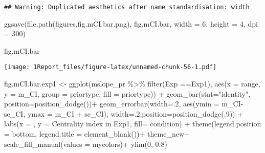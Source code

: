 \documentclass[
]{article}
\newenvironment{Shaded}{\begin{snugshade}}{\end{snugshade}}
\newcommand{\AttributeTok}[1]{\textcolor[rgb]{0.77,0.63,0.00}{#1}}
\newcommand{\DecValTok}[1]{\textcolor[rgb]{0.00,0.00,0.81}{#1}}
\newcommand{\FloatTok}[1]{\textcolor[rgb]{0.00,0.00,0.81}{#1}}
\newcommand{\FunctionTok}[1]{\textcolor[rgb]{0.00,0.00,0.00}{#1}}
\newcommand{\NormalTok}[1]{#1}
\newcommand{\OtherTok}[1]{\textcolor[rgb]{0.56,0.35,0.01}{#1}}
\newcommand{\SpecialCharTok}[1]{\textcolor[rgb]{0.00,0.00,0.00}{#1}}
\newcommand{\StringTok}[1]{\textcolor[rgb]{0.31,0.60,0.02}{#1}}
\begin{document}
\begin{verbatim}
## Warning: Duplicated aesthetics after name standardisation: width
\end{verbatim}

\begin{Shaded}
\begin{Highlighting}[]
\FunctionTok{ggsave}\NormalTok{(}\FunctionTok{file.path}\NormalTok{(}\StringTok{\textquotesingle{}figures\textquotesingle{}}\NormalTok{,}\StringTok{\textquotesingle{}fig.mCI.bar.png\textquotesingle{}}\NormalTok{), fig.mCI.bar, }\AttributeTok{width =} \DecValTok{6}\NormalTok{, }\AttributeTok{height =} \DecValTok{4}\NormalTok{, }\AttributeTok{dpi =} \DecValTok{300}\NormalTok{)}

\NormalTok{fig.mCI.bar}
\end{Highlighting}
\end{Shaded}

\texttt{[image: 1Report\_files/figure-latex/unnamed-chunk-56-1.pdf]}

\begin{Shaded}
\begin{Highlighting}[]
\NormalTok{fig.mCI.bar.exp1 }\OtherTok{\textless{}{-}} \FunctionTok{ggplot}\NormalTok{(mslope\_pr }\SpecialCharTok{\%\textgreater{}\%} \FunctionTok{filter}\NormalTok{(Exp }\SpecialCharTok{==}\StringTok{\textquotesingle{}Exp1\textquotesingle{}}\NormalTok{), }\FunctionTok{aes}\NormalTok{(}\AttributeTok{x =}\NormalTok{ range, }\AttributeTok{y =}\NormalTok{ m\_CI, }\AttributeTok{group =}\NormalTok{ priortype, }\AttributeTok{fill =}\NormalTok{ priortype)) }\SpecialCharTok{+} 
  \FunctionTok{geom\_bar}\NormalTok{(}\AttributeTok{stat=}\StringTok{"identity"}\NormalTok{, }\AttributeTok{position=}\FunctionTok{position\_dodge}\NormalTok{())}\SpecialCharTok{+}
  \FunctionTok{geom\_errorbar}\NormalTok{(}\AttributeTok{width=}\NormalTok{.}\DecValTok{2}\NormalTok{, }\FunctionTok{aes}\NormalTok{(}\AttributeTok{ymin =}\NormalTok{ m\_CI}\SpecialCharTok{{-}}\NormalTok{ se\_CI, }\AttributeTok{ymax =}\NormalTok{ m\_CI }\SpecialCharTok{+}\NormalTok{ se\_CI), }\AttributeTok{width=}\NormalTok{.}\DecValTok{2}\NormalTok{,}\AttributeTok{position=}\FunctionTok{position\_dodge}\NormalTok{(.}\DecValTok{9}\NormalTok{)) }\SpecialCharTok{+}
  \FunctionTok{labs}\NormalTok{(}\AttributeTok{x =} \StringTok{\textquotesingle{} \textquotesingle{}}\NormalTok{, }\AttributeTok{y =} \StringTok{\textquotesingle{}Centrality index in Exp1\textquotesingle{}}\NormalTok{, }\AttributeTok{fill=} \StringTok{\textquotesingle{}condition\textquotesingle{}}\NormalTok{) }\SpecialCharTok{+}
  \FunctionTok{theme}\NormalTok{(}\AttributeTok{legend.position =} \StringTok{\textquotesingle{}bottom\textquotesingle{}}\NormalTok{, }\AttributeTok{legend.title =} \FunctionTok{element\_blank}\NormalTok{())}\SpecialCharTok{+}
\NormalTok{  theme\_new}\SpecialCharTok{+}
  \FunctionTok{scale\_fill\_manual}\NormalTok{(}\AttributeTok{values =}\NormalTok{ mycolors)}\SpecialCharTok{+}
  \FunctionTok{ylim}\NormalTok{(}\DecValTok{0}\NormalTok{, }\FloatTok{0.8}\NormalTok{)}
\end{Highlighting}
\end{Shaded}
\end{document}
